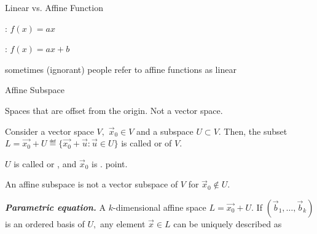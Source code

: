 \documentclass[fleqn,aspectratio=169]{beamer}
\begin{document}
\begin{frame}{Linear vs. Affine Function}

\plitemsep 0.1in
{
\bci 
\item {}: $f(x) = ax$ 
\item {}: $f(x) = ax + b$ 
\item sometimes (ignorant) people refer to affine functions as linear
\eci
}
{
\centering
{}
}

\end{frame}

\begin{frame}{Affine Subspace}

\plitemsep 0.1in
\bci 
\item Spaces that are offset from the origin. Not a vector space.

\item {} Consider a vector space $V,$ $\vec{x}_0 \in V$ and a subspace $U \subset V.$ Then, the subset $L  = \vec{x_0} + U \eqdef \{\vec{x_0} + \vec{u} : \vec{u} \in U \}$ is called  or  of $V.$

\item $U$ is called  or , and $\vec{x}_0$ is . point.

\item An affine subspace is not a vector subspace of $V$ for $\vec{x}_0 \notin U.$

\item {\bf \em Parametric equation.} A $k$-dimensional affine space $L = \vec{x_0} + U.$ If $(\vec{b}_1, \ldots, \vec{b}_k)$ is an ordered basis of $U,$ any element $\vec{x} \in L$ can be uniquely described as

\eci

\end{frame}
\end{document}
